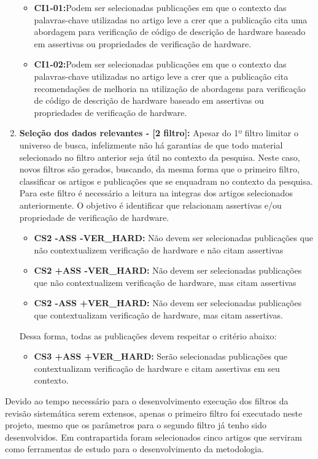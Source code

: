 \begin{enumerate}
	\begin{itemize}
	\item \textbf{CI1-01:}Podem ser selecionadas publicações em que o contexto das palavras-chave utilizadas no artigo leve a crer que a publicação cita uma abordagem para verificação de código de descrição de hardware baseado em assertivas ou propriedades de verificação de hardware.
	\item \textbf{CI1-02:}Podem ser selecionadas publicações em que o contexto das palavras-chave utilizadas no artigo leve a crer que a publicação cita recomendações de melhoria na utilização de abordagens para verificação de código de descrição de hardware baseado em assertivas ou propriedades de verificação de hardware.
	\end{itemize}
	
\item \textbf{Seleção dos dados relevantes - [2 filtro]:} Apesar do 1º filtro limitar o universo de busca, infelizmente não há garantias de que todo material selecionado no filtro anterior seja útil no contexto da pesquisa. Neste caso, novos filtros são gerados, buscando, da mesma forma que o primeiro filtro, classificar os artigos e publicações que se enquadram no contexto da pesquisa. Para este filtro é necessário a leitura na integras dos artigos selecionados anteriormente. O objetivo é identificar que relacionam assertivas e/ou propriedade de verificação de hardware.
    \begin{itemize}
    \item \textbf{CS2 -ASS -VER\_HARD:} Não devem ser selecionadas publicações que não contextualizem verificação de hardware e não citam assertivas
    \item \textbf{CS2 +ASS -VER\_HARD:} Não devem ser selecionadas publicações que não contextualizem verificação de hardware, mas citam assertivas
    \item \textbf{CS2 -ASS +VER\_HARD:} Não devem ser selecionadas publicações que contextualizam verificação de hardware, mas citam assertivas.
    \end{itemize}
Dessa forma, todas as publicações devem respeitar o critério abaixo:
	\begin{itemize}
	\item \textbf{CS3 +ASS +VER\_HARD:} Serão selecionadas publicações que contextualizam verificação de hardware e citam assertivas em seu contexto.
	\end{itemize}     	
\end{enumerate}

\par
Devido ao tempo necessário para o desenvolvimento execução dos filtros da revisão sistemática serem extensos, apenas o primeiro filtro foi executado neste projeto, mesmo que os parâmetros para o segundo filtro já tenho sido desenvolvidos. Em contrapartida foram selecionados cinco artigos que serviram como ferramentas de estudo para o desenvolvimento da metodologia.